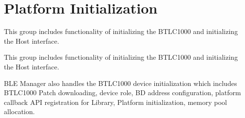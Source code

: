 \hypertarget{group__ble__manager__platform__initialization}{}\section{Platform Initialization}
\label{group__ble__manager__platform__initialization}


This group includes functionality of initializing the B\+T\+L\+C1000 and initializing the Host interface.  


This group includes functionality of initializing the B\+T\+L\+C1000 and initializing the Host interface. 

B\+LE Manager also handles the B\+T\+L\+C1000 device initialization which includes B\+T\+L\+C1000 Patch downloading, device role, BD address configuration, platform callback A\+PI registration for Library, Platform initialization, memory pool allocation.
